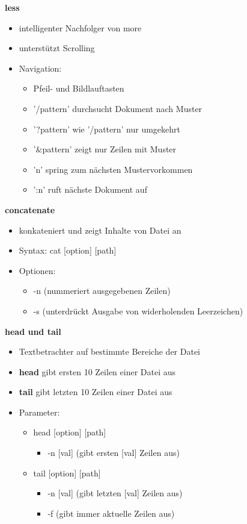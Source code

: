 \documentclass[12pt,utf8, 10pt]{article}
\begin{document}
\textbf{less}
\begin{itemize}
	\item intelligenter Nachfolger von more
	\item unterstützt Scrolling
	\item Navigation:
	\begin{itemize}
		\item Pfeil- und Bildlauftasten
		\item '/pattern' durchsucht Dokument nach Muster
		\item '?pattern' wie '/pattern' nur umgekehrt
		\item '$\&$pattern' zeigt nur Zeilen mit Muster
		\item 'n' spring zum nächsten Mustervorkommen
		\item ':n' ruft nächste Dokument auf
	\end{itemize}
\end{itemize}

\textbf{concatenate}
\begin{itemize}
	\item konkateniert und zeigt Inhalte von Datei an
	\item Syntax: cat [option] [path]
	\item Optionen:
	\begin{itemize}
		\item -n (nummeriert ausgegebenen Zeilen)
		\item -s (unterdrückt Ausgabe von widerholenden Leerzeichen)
	\end{itemize}
\end{itemize}

\textbf{head und tail}
\begin{itemize}
	\item Textbetrachter auf bestimmte Bereiche der Datei
	\item \textbf{head} gibt ersten 10 Zeilen einer Datei aus
	\item \textbf{tail} gibt letzten 10 Zeilen einer Datei aus
	\item Parameter:	
	\begin{itemize}
		\item head [option] [path]
		\begin{itemize}
			\item -n [val] (gibt ersten [val] Zeilen aus)
		\end{itemize}
		\item tail [option] [path]
		\begin{itemize}
			\item -n [val] (gibt letzten [val] Zeilen aus)
			\item -f (gibt immer aktuelle Zeilen aus)
		\end{itemize}
	\end{itemize}
\end{itemize}
\end{document}
